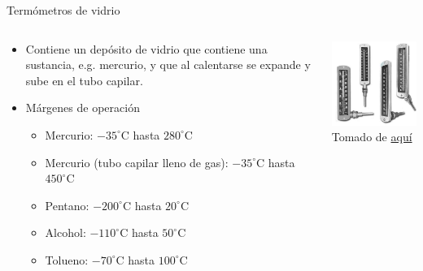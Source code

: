 \documentclass[aspectratio=169]{beamer}
\begin{document}
\begin{frame}{Termómetros de vidrio}
    \begin{columns}[c, onlytextwidth]
        \begin{column}{0.5\textwidth}
            \begin{itemize}
                \item Contiene un depósito de vidrio que contiene una sustancia, e.g. mercurio, y que al calentarse se expande y sube en el tubo capilar.  
                \item Márgenes de operación \cite{sole2005instrumentacion}
                \begin{itemize}
                    \item Mercurio: $-35^\circ$C hasta $280^\circ$C
                    \item Mercurio (tubo capilar lleno de gas): $-35^\circ$C hasta $450^\circ$C
                    \item Pentano: $-200^\circ$C hasta $20^\circ$C
                    \item Alcohol: $-110^\circ$C hasta $50^\circ$C
                    \item Tolueno: $-70^\circ$C hasta $100^\circ$C
                \end{itemize}
            \end{itemize}
        \end{column}
        \begin{column}{0.45\textwidth}
            \centering
            \includegraphics[width=6cm]{fig/TermometroVidrio.jpg}
             \\ \tiny{Tomado de \href{http://famater.com.ar/?p=611}{aquí}}
        
        \end{column}
    \end{columns}
\end{frame}
\end{document}
